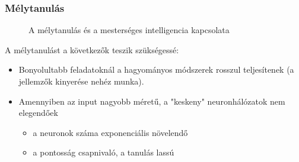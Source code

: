 \subsubsection{Mélytanulás}

\begin{figure}[H]
    \centering
    \caption{A mélytanulás és a mesterséges intelligencia kapcsolata}
    \label{fig:hierarchia}
\end{figure}

A mélytanulást a következők teszik szükségessé:
\begin{itemize}
    \item Bonyolultabb feladatoknál a hagyományos módszerek rosszul
        teljesítenek (a jellemzők kinyerése nehéz munka).
    \item Amennyiben az input nagyobb méretű, a "keskeny" neuronhálózatok
        nem elegendőek
        \begin{itemize}
            \item a neuronok száma exponenciális növelendő
            \item a pontosság csapnivaló, a tanulás lassú
        \end{itemize}
\end{itemize}

